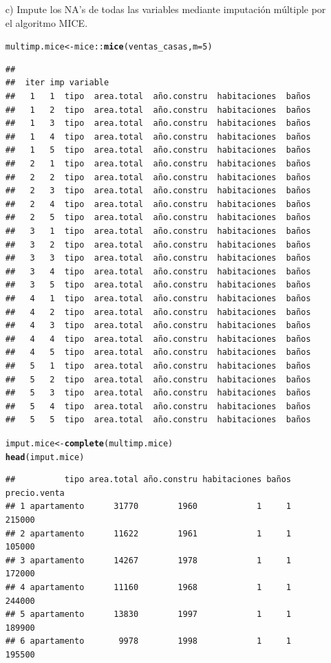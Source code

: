 \documentclass[9pt,letterpaper]{article}\usepackage[]{graphicx}\usepackage[]{color}
\makeatletter
\newcommand{\hlnum}[1]{\textcolor[rgb]{0.686,0.059,0.569}{#1}}%
\newcommand{\hlopt}[1]{\textcolor[rgb]{0,0,0}{#1}}%
\newcommand{\hlstd}[1]{\textcolor[rgb]{0.345,0.345,0.345}{#1}}%
\newcommand{\hlkwb}[1]{\textcolor[rgb]{0.69,0.353,0.396}{#1}}%
\newcommand{\hlkwc}[1]{\textcolor[rgb]{0.333,0.667,0.333}{#1}}%
\newcommand{\hlkwd}[1]{\textcolor[rgb]{0.737,0.353,0.396}{\textbf{#1}}}%
\newenvironment{kframe}{%
 \def\at@end@of@kframe{}%
 \ifinner\ifhmode%
  \def\at@end@of@kframe{\end{minipage}}%
  \begin{minipage}{\columnwidth}%
 \fi\fi%
 \def\FrameCommand##1{\hskip\@totalleftmargin \hskip-\fboxsep
 \colorbox{shadecolor}{##1}\hskip-\fboxsep
     \hskip-\linewidth \hskip-\@totalleftmargin \hskip\columnwidth}%
 \MakeFramed {\advance\hsize-\width
   \@totalleftmargin\z@ \linewidth\hsize
   \@setminipage}}%
 {\par\unskip\endMakeFramed%
 \at@end@of@kframe}
\newenvironment{knitrout}{}{} %
\makeatother
\begin{document}
\begin{enumerate}
\begin{enumerate}
      \item [c)] Impute los NA's de todas las variables mediante imputación múltiple por el algoritmo MICE. 
\begin{knitrout}
\color{fgcolor}\begin{kframe}
\begin{alltt}
\hlstd{multimp.mice}\hlkwb{<-}\hlstd{mice}\hlopt{::}\hlkwd{mice}\hlstd{(ventas_casas,}\hlkwc{m} \hlstd{=} \hlnum{5}\hlstd{)}
\end{alltt}
\begin{verbatim}
## 
##  iter imp variable
##   1   1  tipo  area.total  año.constru  habitaciones  baños
##   1   2  tipo  area.total  año.constru  habitaciones  baños
##   1   3  tipo  area.total  año.constru  habitaciones  baños
##   1   4  tipo  area.total  año.constru  habitaciones  baños
##   1   5  tipo  area.total  año.constru  habitaciones  baños
##   2   1  tipo  area.total  año.constru  habitaciones  baños
##   2   2  tipo  area.total  año.constru  habitaciones  baños
##   2   3  tipo  area.total  año.constru  habitaciones  baños
##   2   4  tipo  area.total  año.constru  habitaciones  baños
##   2   5  tipo  area.total  año.constru  habitaciones  baños
##   3   1  tipo  area.total  año.constru  habitaciones  baños
##   3   2  tipo  area.total  año.constru  habitaciones  baños
##   3   3  tipo  area.total  año.constru  habitaciones  baños
##   3   4  tipo  area.total  año.constru  habitaciones  baños
##   3   5  tipo  area.total  año.constru  habitaciones  baños
##   4   1  tipo  area.total  año.constru  habitaciones  baños
##   4   2  tipo  area.total  año.constru  habitaciones  baños
##   4   3  tipo  area.total  año.constru  habitaciones  baños
##   4   4  tipo  area.total  año.constru  habitaciones  baños
##   4   5  tipo  area.total  año.constru  habitaciones  baños
##   5   1  tipo  area.total  año.constru  habitaciones  baños
##   5   2  tipo  area.total  año.constru  habitaciones  baños
##   5   3  tipo  area.total  año.constru  habitaciones  baños
##   5   4  tipo  area.total  año.constru  habitaciones  baños
##   5   5  tipo  area.total  año.constru  habitaciones  baños
\end{verbatim}
\begin{alltt}
\hlstd{imput.mice}\hlkwb{<-}\hlkwd{complete}\hlstd{(multimp.mice)}
\hlkwd{head}\hlstd{(imput.mice)}
\end{alltt}
\begin{verbatim}
##          tipo area.total año.constru habitaciones baños precio.venta
## 1 apartamento      31770        1960            1     1       215000
## 2 apartamento      11622        1961            1     1       105000
## 3 apartamento      14267        1978            1     1       172000
## 4 apartamento      11160        1968            1     1       244000
## 5 apartamento      13830        1997            1     1       189900
## 6 apartamento       9978        1998            1     1       195500
\end{verbatim}
\end{kframe}
\end{knitrout}


\end{enumerate}
\end{enumerate}
\end{document}
